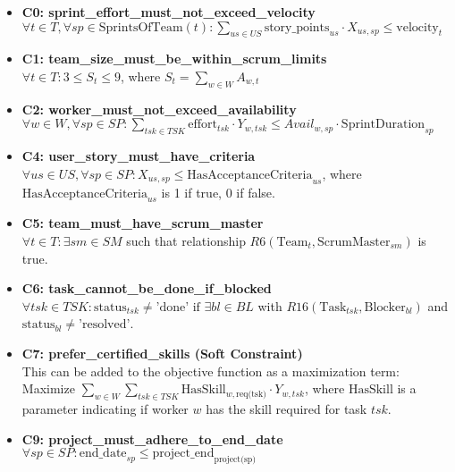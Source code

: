 \documentclass[11pt]{article}
\begin{document}
\begin{itemize}
    \item \textbf{C0: sprint\_effort\_must\_not\_exceed\_velocity} \\
    $\forall t \in T, \forall sp \in \text{SprintsOfTeam}(t): \sum_{us \in US} \text{story\_points}_{us} \cdot X_{us, sp} \le \text{velocity}_t$

    \item \textbf{C1: team\_size\_must\_be\_within\_scrum\_limits} \\
    $\forall t \in T: 3 \le S_t \le 9$, where $S_t = \sum_{w \in W} A_{w,t}$

    \item \textbf{C2: worker\_must\_not\_exceed\_availability} \\
    $\forall w \in W, \forall sp \in SP: \sum_{tsk \in TSK} \text{effort}_{tsk} \cdot Y_{w, tsk} \le Avail_{w, sp} \cdot \text{SprintDuration}_{sp}$

    \item \textbf{C4: user\_story\_must\_have\_criteria} \\
    $\forall us \in US, \forall sp \in SP: X_{us, sp} \le \text{HasAcceptanceCriteria}_{us}$, where $\text{HasAcceptanceCriteria}_{us}$ is 1 if true, 0 if false.

    \item \textbf{C5: team\_must\_have\_scrum\_master} \\
    $\forall t \in T: \exists sm \in SM$ such that relationship $R6(\text{Team}_t, \text{ScrumMaster}_{sm})$ is true.
    
    \item \textbf{C6: task\_cannot\_be\_done\_if\_blocked} \\
    $\forall tsk \in TSK: \text{status}_{tsk} \neq \text{'done'} \text{ if } \exists bl \in BL$ with $R16(\text{Task}_{tsk}, \text{Blocker}_{bl})$ and $\text{status}_{bl} \neq \text{'resolved'}$.

    \item \textbf{C7: prefer\_certified\_skills (Soft Constraint)} \\
    This can be added to the objective function as a maximization term: Maximize $\sum_{w \in W} \sum_{tsk \in TSK} \text{HasSkill}_{w, \text{req(tsk)}} \cdot Y_{w, tsk}$, where $\text{HasSkill}$ is a parameter indicating if worker $w$ has the skill required for task $tsk$.

    \item \textbf{C9: project\_must\_adhere\_to\_end\_date} \\
    $\forall sp \in SP: \text{end\_date}_{sp} \le \text{project\_end}_{\text{project(sp)}}$
\end{itemize}
\end{document}
